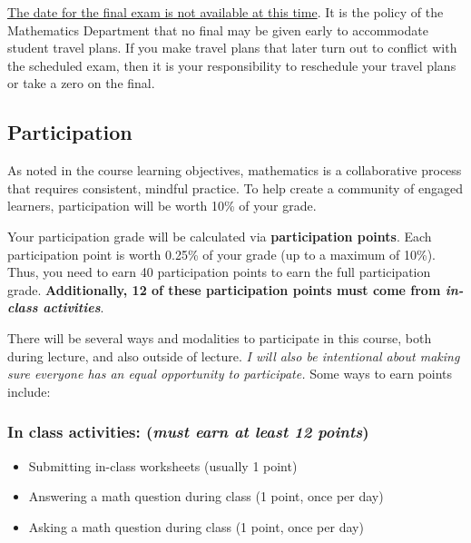 \documentclass[11pt]{article}
\begin{document}
\href{https://registrar.rice.edu/students/final-exams}{The date for the final exam is not available at this time}. It is the policy of the Mathematics Department that no final may be given early to accommodate student travel plans. If you make travel plans that later turn out to conflict with the scheduled exam, then it is your responsibility to reschedule your travel plans or take a zero on the final.

    


\subsection{Participation}

As noted in the course learning objectives, mathematics is a collaborative process that requires consistent, mindful practice.  To help
create a community of engaged learners, participation will be worth 10\% of your grade.

Your participation grade will be calculated via \textbf{participation points}.  Each participation point is worth 0.25\% of your grade (up to a maximum of 10\%).  Thus, you need to earn 40 participation points to earn the full participation grade.  \textbf{Additionally, 12 of these participation points must come from \emph{in-class activities}}.  

There will be several ways and modalities to participate in this course, both during lecture, and also outside of lecture.  \emph{I will also be intentional about making sure everyone has an equal opportunity to participate.} Some ways to earn points include:

\vspace{-1em}
\subsubsection*{In class activities: (\textit{must earn at least 12 points})}
\begin{itemize}[]
    \item Submitting in-class worksheets (usually 1 point)
    \item Answering a math question during class (1 point, once per day)
    \item Asking a math question during class (1 point, once per day)
\end{itemize}
\end{document}
